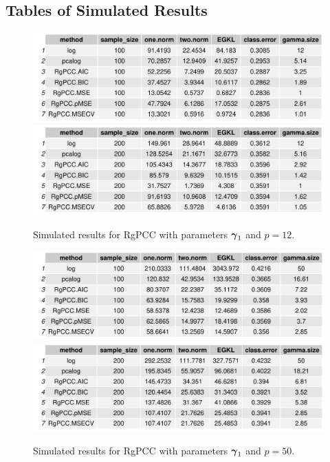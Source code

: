\documentclass[main.tex]{subfiles}
\begin{document}
\subsection{Tables of Simulated Results}
\begin{figure}[H]
	\centering
	\includegraphics[width =  \textwidth]{simulated/(sparsity1-100,12)_metrics.pdf}
	\includegraphics[width =  \textwidth]{simulated/(sparsity1-200,12)_metrics.pdf}
	\caption{Simulated results for RgPCC with parameters $\boldsymbol \gamma_1$ and $p = 12$.}
	\label{fig:simulated1-12}
\end{figure}

\begin{figure}[H]
	\centering
	\includegraphics[width =  \textwidth]{simulated/(sparsity1-100,50)_metrics.pdf}
	\includegraphics[width =  \textwidth]{simulated/(sparsity1-200,50)_metrics.pdf}
	\caption{Simulated results for RgPCC with parameters $\boldsymbol \gamma_1$ and $p = 50$.}
	\label{fig:simulated1-50}
\end{figure}
\end{document}
